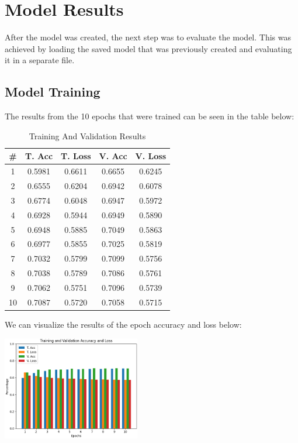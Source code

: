 \documentclass[
	a4paper, %
	10pt, %
	unnumberedsections, %
	twoside, %
]{LTJournalArticle}
\begin{document}
\section{Model Results}

After the model was created, the next step was to evaluate the model. This was achieved by loading the saved model that was previously created and evaluating it in a separate file. 

\subsection{Model Training}

The results from the 10 epochs that were trained can be seen in the table below:

\begin{table}[ht]
	\centering
	\begin{tabular}{|c|c|c|c|c|}
		\hline
		\textbf{\#} & \textbf{T. Acc} & \textbf{T. Loss} & \textbf{V. Acc} & \textbf{V. Loss} \\ \hline
		1 & 0.5981 & 0.6611 & 0.6655 & 0.6245 \\ \hline
		2 & 0.6555 & 0.6204 & 0.6942 & 0.6078 \\ \hline
		3 & 0.6774 & 0.6048 & 0.6947 & 0.5972 \\ \hline
		4 & 0.6928 & 0.5944 & 0.6949 & 0.5890 \\ \hline
		5 & 0.6948 & 0.5885 & 0.7049 & 0.5863 \\ \hline
		6 & 0.6977 & 0.5855 & 0.7025 & 0.5819 \\ \hline
		7 & 0.7032 & 0.5799 & 0.7099 & 0.5756 \\ \hline
		8 & 0.7038 & 0.5789 & 0.7086 & 0.5761 \\ \hline
		9 & 0.7062 & 0.5751 & 0.7096 & 0.5739 \\ \hline
		10 & 0.7087 & 0.5720 & 0.7058 & 0.5715 \\ \hline
	\end{tabular}
	\caption*{Training And Validation Results}
\end{table}

We can visualize the results of the epoch accuracy and loss below:

\begin{center}
	\includegraphics[width=0.45\textwidth]{Figures/Epoch Results Graph.png}
\end{center}
\end{document}
